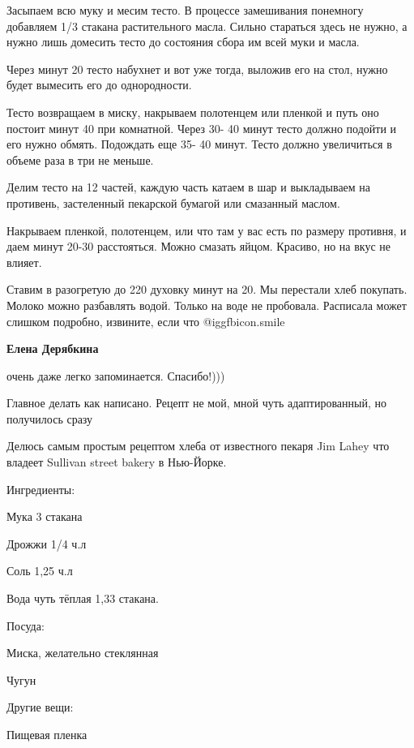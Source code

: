 \begin{itemize}
Засыпаем всю муку и месим тесто. В процессе замешивания понемногу добавляем 1/3
стакана растительного масла. Сильно стараться здесь не нужно, а нужно лишь
домесить тесто до состояния сбора им всей муки и масла.

Через минут 20 тесто набухнет и вот уже тогда, выложив его на стол, нужно будет
вымесить его до однородности.

Тесто возвращаем в миску, накрываем полотенцем или пленкой и путь оно постоит
минут 40 при комнатной. Через 30- 40 минут тесто должно подойти и его нужно
обмять. Подождать еще 35- 40 минут. Тесто должно увеличиться в объеме раза в
три не меньше.

Делим тесто на 12 частей, каждую часть катаем в шар и выкладываем на противень,
застеленный пекарской бумагой или смазанный маслом.

Накрываем пленкой, полотенцем, или что там у вас есть по размеру противня, и
даем минут 20-30 расстояться. Можно смазать яйцом. Красиво, но на вкус не
влияет.

Ставим в разогретую до 220 духовку минут на 20. Мы перестали хлеб покупать.
Молоко можно разбавлять водой. Только на воде не пробовала. Расписала может
слишком подробно, извините, если что  @igg{fbicon.smile} 

\begin{itemize} %
\textbf{Елена Дерябкина} 

очень даже легко запоминается. Спасибо!)))


Главное делать как написано. Рецепт не мой, мной чуть адаптированный, но
получилось сразу

\end{itemize} %


Делюсь самым простым рецептом хлеба от известного пекаря Jim Lahey что владеет
Sullivan street bakery в Нью-Йорке.

Ингредиенты:

Мука 3 стакана

Дрожжи 1/4 ч.л

Соль 1,25 ч.л

Вода чуть тёплая 1,33 стакана.

Посуда:

Миска, желательно стеклянная

Чугун

Другие вещи:

Пищевая пленка


\end{itemize}
